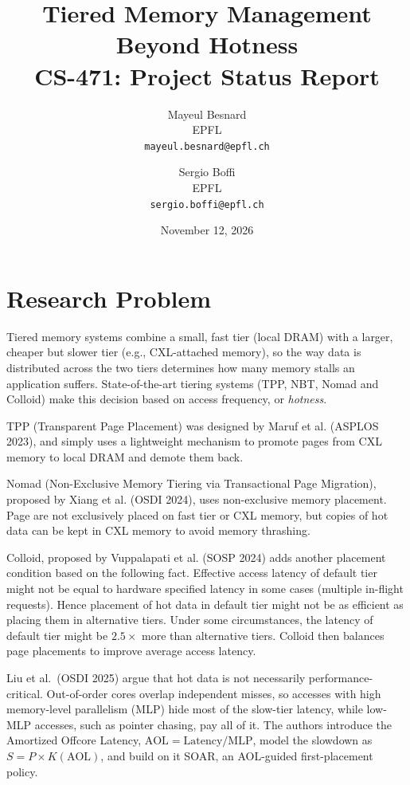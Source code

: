 \documentclass[10pt,a4paper]{article}
\title{Tiered Memory Management Beyond Hotness\\
\large CS-471: Project Status Report}
\author{
Mayeul Besnard\\
EPFL\\
\texttt{mayeul.besnard@epfl.ch}
\and
Sergio Boffi\\
EPFL\\
\texttt{sergio.boffi@epfl.ch}
}
\date{November 12, 2026}
\begin{document}
\maketitle

\tableofcontents

\section{Research Problem}
Tiered memory systems combine a small, fast tier (local DRAM) with a larger,
cheaper but slower tier (e.g., CXL-attached memory), so the way data is
distributed across the two tiers determines how many memory stalls an
application suffers. State-of-the-art tiering systems (TPP, NBT, Nomad and
Colloid) make this decision based on access frequency, or \emph{hotness}. 

TPP (Transparent Page Placement) was designed by Maruf et al. (ASPLOS 2023), and simply uses a lightweight mechanism to promote pages from CXL memory to local DRAM and demote them back.

Nomad (Non-Exclusive Memory Tiering via Transactional Page Migration), proposed by Xiang et al. (OSDI 2024), uses non-exclusive memory placement. Page are not exclusively placed on fast tier or CXL memory, but copies of hot data can be kept in CXL memory to avoid memory thrashing. 

Colloid, proposed by Vuppalapati et al. (SOSP 2024) adds another placement condition based on the following fact. Effective access latency of default tier might not be equal to hardware specified latency in some cases (multiple in-flight requests). Hence placement of hot data in default tier might not be as efficient as placing them in alternative tiers. Under some circumstances, the latency of default tier might be $2.5 \times$ more than alternative tiers. Colloid then balances page placements to improve average access latency. 

Liu et al.\ (OSDI 2025) argue that hot data is not necessarily
performance-critical. Out-of-order cores overlap independent misses, so accesses
with high memory-level parallelism (MLP) hide most of the slow-tier latency,
while low-MLP accesses, such as pointer chasing, pay all of it. The authors
introduce the Amortized Offcore Latency, $\text{AOL} = \text{Latency}/\text{MLP}$,
model the slowdown as $S = P \times K(\text{AOL})$, and build on it SOAR, an
AOL-guided first-placement policy.
\end{document}
